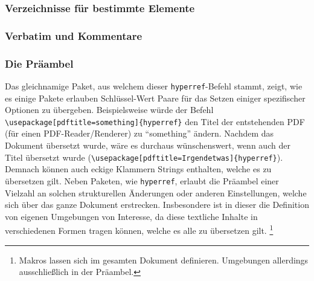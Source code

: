 \subsubsection{Verzeichnisse für bestimmte Elemente}%

\subsubsection{Verbatim und Kommentare}%

\subsubsection{Die Präambel}%

Das gleichnamige Paket, aus welchem dieser \texttt{hyperref}-Befehl stammt, zeigt, wie es einige Pakete erlauben Schlüssel-Wert Paare für das Setzen einiger spezifischer Optionen zu übergeben. Beispielsweise würde der Befehl \verb|\usepackage[pdftitle=something]{hyperref}| den Titel der entstehenden PDF (für einen PDF-Reader/Renderer) zu \enquote{something} ändern. Nachdem das Dokument übersetzt wurde, wäre es durchaus wünschenswert, wenn auch der Titel übersetzt wurde (\verb|\usepackage[pdftitle=Irgendetwas]{hyperref}|). Demnach können auch eckige Klammern Strings enthalten, welche es zu übersetzen gilt. 
Neben Paketen, wie \texttt{hyperref}, erlaubt die Präambel einer Vielzahl an solchen strukturellen Änderungen oder anderen Einstellungen, welche sich über das ganze Dokument erstrecken. 
Insbesondere ist in dieser die Definition von eigenen Umgebungen von Interesse, da diese textliche Inhalte in verschiedenen Formen tragen können, welche es alle zu übersetzen gilt.
\footnote{Makros lassen sich im gesamten Dokument definieren. Umgebungen allerdings ausschließlich in der Präambel.}



